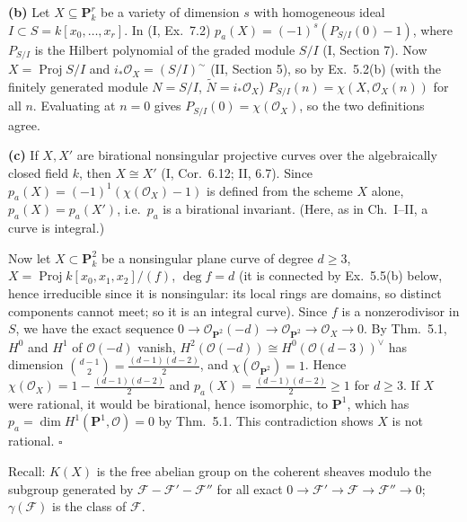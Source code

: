 \documentclass[11pt]{article}
\begin{document}
\textbf{(b)} Let $X\subseteq\mathbf P^r_k$ be a variety of dimension $s$ with homogeneous ideal $I\subset S=k[x_0,\dots,x_r]$. In (I, Ex.~7.2) $p_a(X)=(-1)^s(P_{S/I}(0)-1)$, where $P_{S/I}$ is the Hilbert polynomial of the graded module $S/I$ (I, Section 7). Now $X=\operatorname{Proj}S/I$ and $i_*\mathcal O_X=(S/I)^\sim$ (II, Section 5), so by Ex.~5.2(b) (with the finitely generated module $N=S/I$, $\tilde N=i_*\mathcal O_X$) $P_{S/I}(n)=\chi(X,\mathcal O_X(n))$ for all $n$. Evaluating at $n=0$ gives $P_{S/I}(0)=\chi(\mathcal O_X)$, so the two definitions agree.

\textbf{(c)} If $X,X'$ are birational nonsingular projective curves over the algebraically closed field $k$, then $X\cong X'$ (I, Cor.~6.12; II, 6.7). Since $p_a(X)=(-1)^1(\chi(\mathcal O_X)-1)$ is defined from the scheme $X$ alone, $p_a(X)=p_a(X')$, i.e.\ $p_a$ is a birational invariant. (Here, as in Ch.~I--II, a curve is integral.)

Now let $X\subset\mathbf P^2_k$ be a nonsingular plane curve of degree $d\ge3$, $X=\operatorname{Proj}k[x_0,x_1,x_2]/(f)$, $\deg f=d$ (it is connected by Ex.~5.5(b) below, hence irreducible since it is nonsingular: its local rings are domains, so distinct components cannot meet; so it is an integral curve). Since $f$ is a nonzerodivisor in $S$, we have the exact sequence $0\to\mathcal O_{\mathbf P^2}(-d)\to\mathcal O_{\mathbf P^2}\to\mathcal O_X\to0$. By Thm.~5.1, $H^0$ and $H^1$ of $\mathcal O(-d)$ vanish, $H^2(\mathcal O(-d))\cong H^0(\mathcal O(d-3))^\vee$ has dimension $\binom{d-1}{2}=\frac{(d-1)(d-2)}2$, and $\chi(\mathcal O_{\mathbf P^2})=1$. Hence $\chi(\mathcal O_X)=1-\frac{(d-1)(d-2)}2$ and $p_a(X)=\frac{(d-1)(d-2)}2\ge1$ for $d\ge3$. If $X$ were rational, it would be birational, hence isomorphic, to $\mathbf P^1$, which has $p_a=\dim H^1(\mathbf P^1,\mathcal O)=0$ by Thm.~5.1. This contradiction shows $X$ is not rational. \hfill$\square$

\pf
Recall: $K(X)$ is the free abelian group on the coherent sheaves modulo the subgroup generated by $\mathcal F-\mathcal F'-\mathcal F''$ for all exact $0\to\mathcal F'\to\mathcal F\to\mathcal F''\to0$; $\gamma(\mathcal F)$ is the class of $\mathcal F$.
\end{document}
